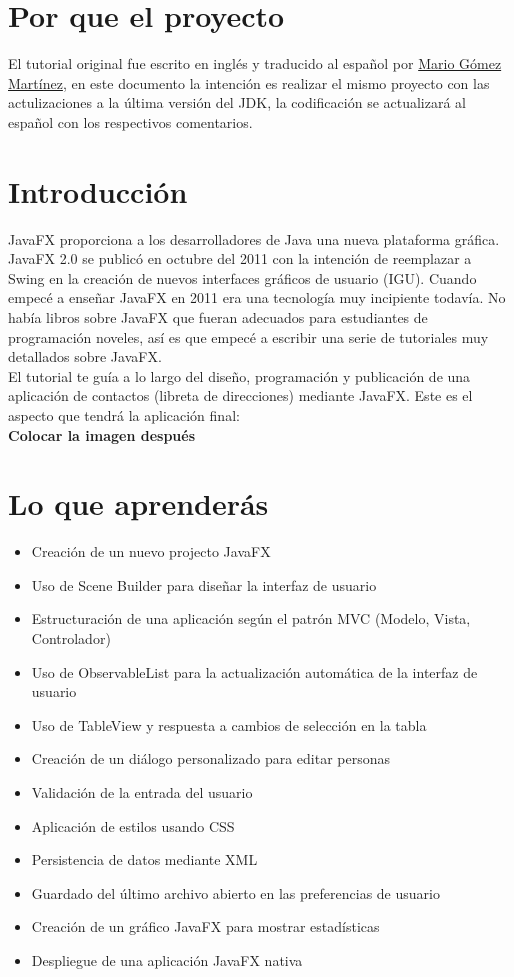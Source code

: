 \section{Por que el proyecto}
El tutorial original fue escrito en inglés y traducido al español por \textcolor{azul}{\href{https://about.me/magomar}{Mario Gómez Martínez}}, en este documento la intención es realizar el mismo proyecto con las actulizaciones a la última versión del JDK, la codificación se actualizará al español con los respectivos comentarios. 
\section{Introducción}
JavaFX proporciona a los desarrolladores de Java una nueva plataforma gráfica. JavaFX 2.0 se publicó en octubre del 2011 con la intención de reemplazar a Swing en la creación de nuevos interfaces gráficos de usuario (IGU). Cuando empecé a enseñar JavaFX en 2011 era una tecnología muy incipiente todavía. No había libros sobre JavaFX que fueran adecuados para estudiantes de programación noveles, así es que empecé a escribir una serie de tutoriales muy detallados sobre JavaFX.\\
El tutorial te guía a lo largo del diseño, programación y publicación de una aplicación de contactos (libreta de direcciones) mediante JavaFX. Este es el aspecto que tendrá la aplicación final:\\
\textbf{Colocar la imagen después}\\
\section{Lo que aprenderás}
\begin{itemize}
	\item Creación de un nuevo projecto JavaFX
	\item Uso de Scene Builder para diseñar la interfaz de usuario
	\item Estructuración de una aplicación según el patrón MVC (Modelo, Vista, Controlador)
	\item Uso de ObservableList para la actualización automática de la interfaz de usuario
	\item Uso de TableView y respuesta a cambios de selección en la tabla
	\item Creación de un diálogo personalizado para editar personas
	\item Validación de la entrada del usuario
	\item Aplicación de estilos usando CSS
	\item Persistencia de datos mediante XML
	\item Guardado del último archivo abierto en las preferencias de usuario
	\item Creación de un gráfico JavaFX para mostrar estadísticas
	\item Despliegue de una aplicación JavaFX nativa
\end{itemize}

